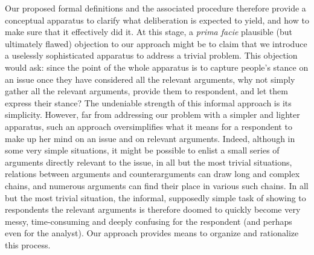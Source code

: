 \documentclass[version=3.21, pagesize, twoside=off, bibliography=totoc, DIV=calc, fontsize=12pt, a4paper, french, english]{scrartcl}
\begin{document}
Our proposed formal definitions and the associated procedure therefore provide a conceptual apparatus to clarify what deliberation is expected to yield, and how to make sure that it effectively did it. At this stage, a \emph{prima facie} plausible (but ultimately flawed) objection to our approach might be to claim that we introduce a uselessly sophisticated apparatus to address a trivial problem. This objection would ask: since the point of the whole apparatus is to capture people’s stance on an issue once they have considered all the relevant arguments, why not simply gather all the relevant arguments, provide them to respondent, and let them express their stance? The undeniable strength of this informal approach is its simplicity. However, far from addressing our problem with a simpler and lighter apparatus, such an approach oversimplifies what it means for a respondent to make up her mind on an issue and on relevant arguments. Indeed, although in some very simple situations, it might be possible to enlist a small series of arguments directly relevant to the issue, in all but the most trivial situations, relations between arguments and counterarguments can draw long and complex chains, and numerous arguments can find their place in various such chains. In all but the most trivial situation, the informal, supposedly simple task of showing to respondents the relevant arguments is therefore doomed to quickly become very messy, time-consuming and deeply confusing for the respondent (and perhaps even for the analyst). Our approach provides means to organize and rationalize this process.

\end{document}
